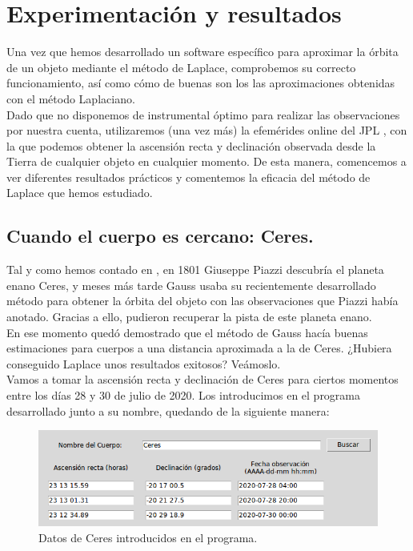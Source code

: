 
\chapter{Experimentación y resultados}
\label{chap:experimentation}
Una vez que hemos desarrollado un software específico para aproximar la órbita de un objeto mediante el método de Laplace, comprobemos su correcto funcionamiento, así como cómo de buenas son los las aproximaciones obtenidas con el método Laplaciano.\\

Dado que no disponemos de instrumental óptimo para realizar las observaciones por nuestra cuenta, utilizaremos (una vez más) la efemérides online del JPL \cite{jpl}, con la que podemos obtener la ascensión recta y declinación observada desde la Tierra de cualquier objeto en cualquier momento. De esta manera, comencemos a ver diferentes resultados prácticos y comentemos la eficacia del método de Laplace que hemos estudiado.\\

\section{Cuando el cuerpo es cercano: Ceres.}
\label{sec:exp_ceres}
Tal y como hemos contado en \label{sec:history}, en 1801 Giuseppe Piazzi descubría el planeta enano Ceres, y meses más tarde Gauss usaba su recientemente desarrollado método para obtener la órbita del objeto con las observaciones que Piazzi había anotado. Gracias a ello, pudieron recuperar la pista de este planeta enano.\\

En ese momento quedó demostrado que el método de Gauss hacía buenas estimaciones para cuerpos a una distancia aproximada a la de Ceres. ¿Hubiera conseguido Laplace unos resultados exitosos? Veámoslo.\\

Vamos a tomar la ascensión recta y declinación de Ceres para ciertos momentos entre los días 28 y 30 de julio de 2020. Los introducimos en el programa desarrollado junto a su nombre, quedando de la siguiente manera:
\begin{figure}[H]
\centering
\includegraphics[scale=0.5]{images/ceres_exp.png}
\caption{Datos de Ceres introducidos en el programa.}
\label{fig:ceres_exp}
\end{figure}

